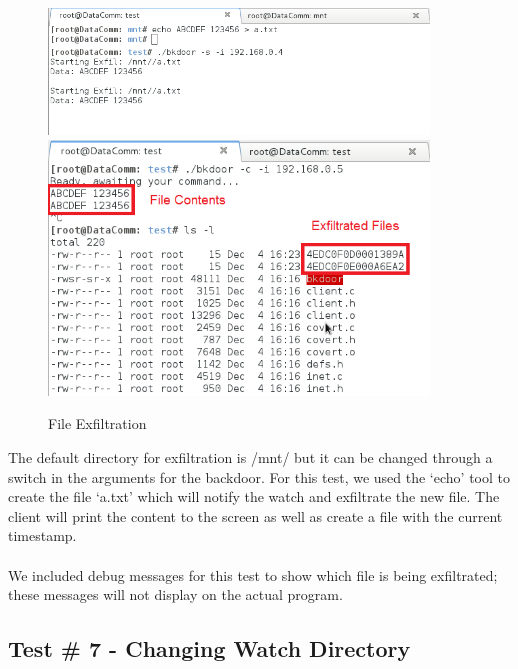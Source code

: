 \documentclass[titlepage]{article}
\begin{document}
\begin{figure}[htb]                                                                       
  \begin{center}
    \includegraphics[width=0.9\textwidth]{Pictures/Exfiltration.png}
    \includegraphics[width=0.9\textwidth]{Pictures/CExfiltration.png}
  \end{center}
  \caption{File Exfiltration}
  \label{fig:exfiltration}
\end{figure}

The default directory for exfiltration is /mnt/ but it can be changed through a switch in
the arguments for the backdoor.  For this test, we used the `echo' tool to create the
file `a.txt' which will notify the watch and exfiltrate the new file.  The client will
print the content to the screen as well as create a file with the current timestamp.\\
\\
We included debug messages for this test to show which file is being exfiltrated; these
messages will not display on the actual program.

\clearpage

\subsection{Test \# 7 - Changing Watch Directory}
\end{document}
